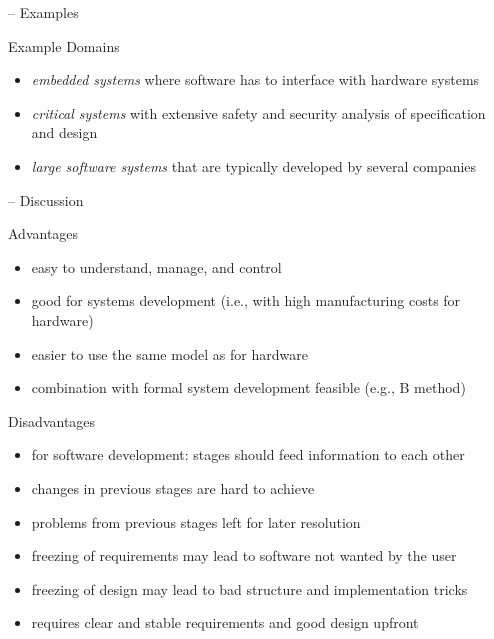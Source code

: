 \begin{frame}{\insertsubsection{} -- Examples\ \mytitlesource{\sommerville}}
	\begin{fancycolumns}[animation=none]
		\begin{example}{Example Domains}
			\begin{itemize}
				\item \emph{embedded systems} where software has to interface with hardware systems
				\item \emph{critical systems} with extensive safety and security analysis of specification and design
				\item \emph{large software systems} that are typically developed by several companies
			\end{itemize}
		\end{example}
		\nextcolumn
	\end{fancycolumns}
\end{frame}

\begin{frame}{\insertsubsection{} -- Discussion\ \mytitlesource{\sommerville}}
	\begin{fancycolumns}
		\begin{note}{Advantages}
			\begin{itemize}
				\item easy to understand, manage, and control
				\item good for systems development (i.e., with high manufacturing costs for hardware)
				\item easier to use the same model as for hardware
				\item combination with formal system development feasible (e.g., B method)
			\end{itemize}
		\end{note}
		\nextcolumn
		\begin{note}{Disadvantages}
			\begin{itemize}
				\item for software development: stages should feed information to each other
				\item changes in previous stages are hard to achieve
				\item problems from previous stages left for later resolution
				\item freezing of requirements may lead to software not wanted by the user
				\item freezing of design may lead to bad structure and implementation tricks
				\item requires clear and stable requirements and good design upfront
			\end{itemize}
		\end{note}
	\end{fancycolumns}
\end{frame}

